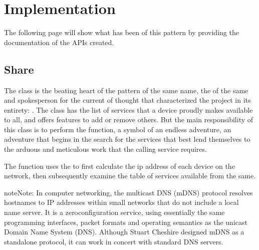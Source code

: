 \documentclass[a4paper,10pt,english,openany,oneside]{sphinxmanual}
\begin{document}
\begin{sphinxVerbatim}[commandchars=\\\{\}]
   

 
\end{sphinxVerbatim}


\chapter{Implementation}
\label{\detokenize{code:implementation}}\label{\detokenize{code::doc}}
The following page will show what has been  of this pattern by providing the documentation of the APIs created.


\section{Share}
\label{\detokenize{code:share}}
The  class is the beating heart of the pattern of the same name, the  of the same and spokesperson for the
current of thought that characterized the project in its entirety: . The class has the list of services
that a device proudly makes available to all, and offers features to add or remove others. But the main responsibility of this
class is to perform the  function, a symbol of an endless adventure, an adventure that begins in the search for the
services that best lend themselves to the arduous and meticulous work that the calling service requires.

The function uses the  to first calculate the ip address of each device on the network,
then subsequently examine the table of services available from the same.

\begin{sphinxadmonition}{note}{Note:}
In computer networking, the multicast DNS (mDNS) protocol resolves hostnames to IP addresses
within small networks that do not include a local name server. It is a zero\sphinxhyphen{}configuration service,
using essentially the same programming interfaces, packet formats and operating semantics as the
unicast Domain Name System (DNS). Although Stuart Cheshire designed mDNS as a stand\sphinxhyphen{}alone protocol,
it can work in concert with standard DNS servers.
\end{sphinxadmonition}
\end{document}
